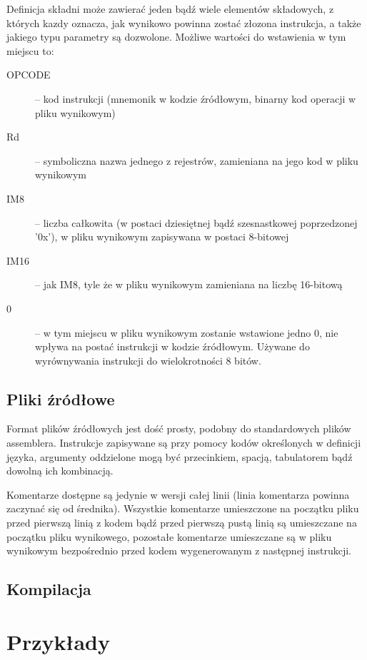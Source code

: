 \documentclass[a4paper,12pt]{report}
\begin{document}
Definicja składni może zawierać jeden bądź wiele elementów składowych, z których kazdy oznacza, jak wynikowo powinna zostać złozona instrukcja, a także jakiego typu parametry są dozwolone. Możliwe wartości do wstawienia w tym miejscu to:
\begin{description}
  \item[OPCODE] -- kod instrukcji (mnemonik w kodzie źródłowym, binarny kod operacji w pliku wynikowym)
  \item[Rd] -- symboliczna nazwa jednego z rejestrów, zamieniana na jego kod w pliku wynikowym
  \item[IM8] -- liczba całkowita (w postaci dziesiętnej bądź szesnastkowej poprzedzonej '0x'), w pliku wynikowym zapisywana w postaci 8-bitowej
  \item[IM16] -- jak IM8, tyle że w pliku wynikowym zamieniana na liczbę 16-bitową
  \item[0] -- w tym miejscu w pliku wynikowym zostanie wstawione jedno 0, nie wpływa na postać instrukcji w kodzie źródłowym. Używane do wyrównywania instrukcji do wielokrotności 8 bitów.
\end{description}

\subsection{Pliki źródłowe}

Format plików źródłowych jest dość prosty, podobny do standardowych plików assemblera. Instrukcje zapisywane są przy pomocy kodów określonych w definicji języka, argumenty oddzielone mogą być przecinkiem, spacją, tabulatorem bądź dowolną ich kombinacją. 

Komentarze dostępne są jedynie w wersji całej linii (linia komentarza powinna zaczynać się od średnika). Wszystkie komentarze umieszczone na początku pliku przed pierwszą linią z kodem bądź przed pierwszą pustą linią są umieszczane na początku pliku wynikowego, pozostałe komentarze umieszczane są w pliku wynikowym bezpośrednio przed kodem wygenerowanym z następnej instrukcji.

\subsection{Kompilacja}

\section{Przykłady}
\end{document}

